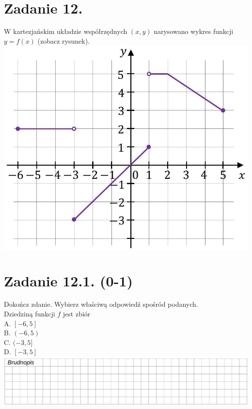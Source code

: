 \documentclass[10pt]{article}
\begin{document}
\section*{Zadanie 12.}
W kartezjańskim układzie współrzędnych \((x, y)\) narysowano wykres funkcji \(y=f(x)\) (zobacz rysunek).\\
\includegraphics[max width=\textwidth, center]{2024_11_21_51cb67544fb9b029f01cg-12(2)}

\section*{Zadanie 12.1. (0-1)}
Dokończ zdanie. Wybierz właściwą odpowiedź spośród podanych.\\
Dziedziną funkcji \(f\) jest zbiór\\
A. \([-6,5]\)\\
B. \((-6,5)\)\\
C. \((-3,5]\)\\
D. \([-3,5]\)\\
\includegraphics[max width=\textwidth, center]{2024_11_21_51cb67544fb9b029f01cg-12(1)}
\end{document}
